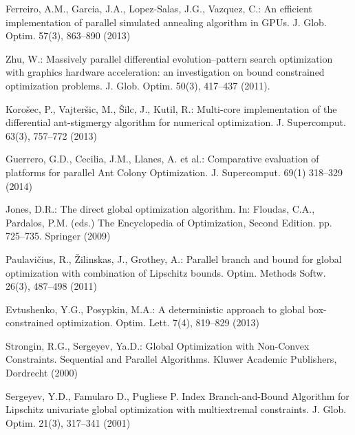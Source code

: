 \documentclass[smallextended]{svjour3}       %
\begin{document}
\begin{thebibliography}{}

Ferreiro, A.M., Garcia, J.A., Lopez-Salas, J.G., Vazquez, C.: An efficient implementation of parallel simulated annealing algorithm in GPUs. J. Glob. Optim. 57(3), 863--890 (2013)

Zhu, W.: Massively parallel differential evolution--pattern search optimization with graphics hardware acceleration: an investigation on bound constrained optimization problems. J. Glob. Optim. 50(3), 417--437 (2011).

Koro\v sec, P., Vajter\v sic, M.,  \v Silc, J., Kutil, R.: Multi-core implementation of the differential ant-stigmergy algorithm for numerical optimization. J. Supercomput. 63(3), 757--772 (2013)

Guerrero, G.D., Cecilia, J.M., Llanes, A. et al.: Comparative evaluation of platforms for parallel Ant Colony Optimization. J. Supercomput. 69(1) 318--329 (2014)

Jones, D.R.: The direct global optimization algorithm. In: Floudas, C.A., Pardalos, P.M. (eds.) The Encyclopedia of Optimization, Second Edition. pp. 725--735. Springer (2009)

Paulavi\v cius, R., \v Zilinskas, J., Grothey, A.: Parallel branch and bound for global optimization with combination of Lipschitz bounds. Optim. Methods Softw. 26(3), 487--498 (2011)

Evtushenko, Y.G., Posypkin, M.A.: A deterministic approach to global box-constrained optimization. Optim. Lett. 7(4), 819--829 (2013)

Strongin, R.G., Sergeyev, Ya.D.: Global Optimization with Non-Convex Constraints. Sequential and Parallel Algorithms. Kluwer Academic Publishers, Dordrecht (2000)




Sergeyev, Y.D., Famularo D., Pugliese P. Index Branch-and-Bound Algorithm for Lipschitz univariate global optimization with multiextremal constraints. J. Glob. Optim. 21(3), 317--341 (2001) 


\end{thebibliography}
\end{document}
